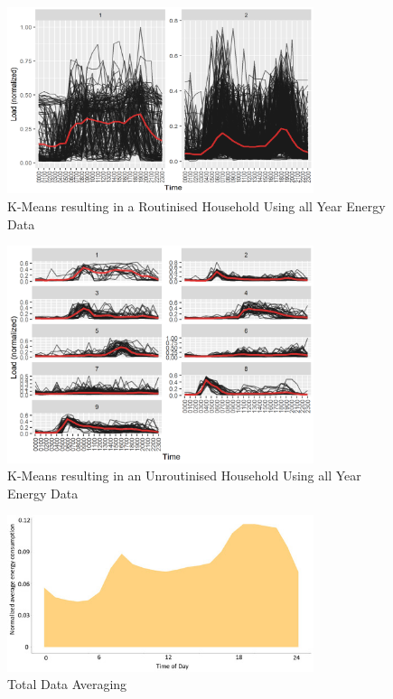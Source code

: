 \begin{figure}
    \centering
    \includegraphics[width=0.8\textwidth]{figures/malatesta_hsop/malatesta_routinisedHousehold.jpg}
    \caption{K-Means resulting in a Routinised Household Using all Year Energy Data \cite{MAL-HBP}}
    \label{fig:routinized_household}
\end{figure}

\begin{figure}
    \centering
    \includegraphics[width=0.8\textwidth]{figures/malatesta_hsop/malatesta_unroutinisedHousehold.jpg}
    \caption{K-Means resulting in an Unroutinised Household Using all Year Energy Data \cite{MAL-HBP}}
    \label{fig:non_routinized_household}
\end{figure}

\begin{figure}
    \centering
    \includegraphics[width=0.8\textwidth]{figures/malatesta_hsop/malatesta_totalDataAveraging.jpg}
    \caption{Total Data Averaging \cite{MAL-HBP}}
    \label{fig:total_data_averaging}
\end{figure}

